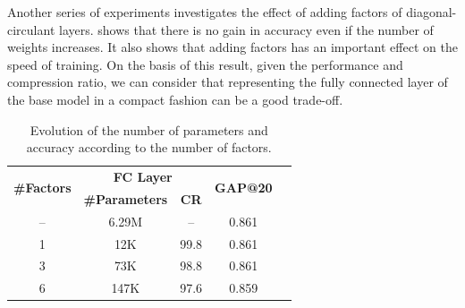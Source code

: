 Another series of experiments investigates the effect of adding factors of diagonal-circulant layers.
 shows that there is no gain in accuracy even if the number of weights increases.
It also shows that adding factors has an important effect on the speed of training.
On the basis of this result, \ie given the performance and compression ratio, we can consider that representing the fully connected layer of the base model in a compact fashion can be a good trade-off.


%   



\begin{table}[ht]
  \centering
  \begin{tabular}{ccccc}
    \toprule
    \multirow{2}{*}{\textbf{\#Factors}} & \multicolumn{2}{c}{\textbf{FC Layer}} & \multirow{2}{*}{\textbf{GAP@20}} \\
    \cmidrule{2-3}
     & \textbf{\#Parameters} & \textbf{CR} \\
    \midrule
    -- & 6.29M & -- & 0.861 \\
    1 & 12K & 99.8 & 0.861 \\
    3 & 73K & 98.8 & 0.861 \\
    6 & 147K & 97.6 & 0.859 \\
    \bottomrule
  \end{tabular}
  \caption{Evolution of the number of parameters and accuracy according to the number of factors.} 
  \label{table:ap2-factors}
\end{table}


